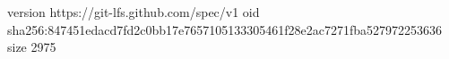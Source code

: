 version https://git-lfs.github.com/spec/v1
oid sha256:847451edacd7fd2c0bb17e7657105133305461f28e2ac7271fba527972253636
size 2975
